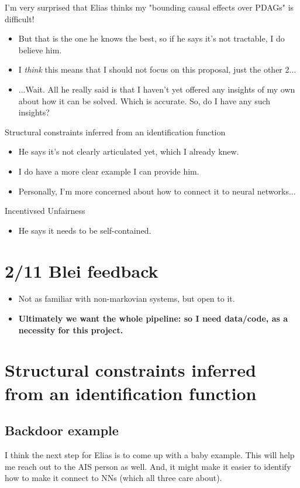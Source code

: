 \documentclass[letterpaper,10pt]{article}
\begin{document}
I'm very surprised that Elias thinks my "bounding causal effects over PDAGs" is difficult!
\begin{itemize}
  \item But that is the one he knows the best, so if he says it's not tractable, I do believe him. 
  \item I \emph{think} this means that I should not focus on this proposal, just the other 2...
  \item...Wait. All he really said is that I haven't yet offered any insights of my own about how it can be solved. Which is accurate. So, do I have any such insights?
\end{itemize}

Structural constraints inferred from an identification function
\begin{itemize}
  \item He says it's not clearly articulated yet, which I already knew.
  \item I do have a more clear example I can provide him.
  \item Personally, I'm more concerned about how to connect it to neural networks...
\end{itemize}

Incentivsed Unfairness
\begin{itemize}
  \item He says it needs to be self-contained.
\end{itemize}

\section{2/11 Blei feedback}
\begin{itemize}
  \item Not as familiar with non-markovian systems, but open to it.
  \item \textbf{Ultimately we want the whole pipeline: so I need data/code, as a necessity for this project.}
\end{itemize}

\newpage
\section{Structural constraints inferred from an identification function}
\subsection{Backdoor example}
I think the next step for Elias is to come up with a baby example. This will help me reach out to the AIS person as well. And, it might make it easier to identify how to make it connect to NNs (which all three care about).
\end{document}
